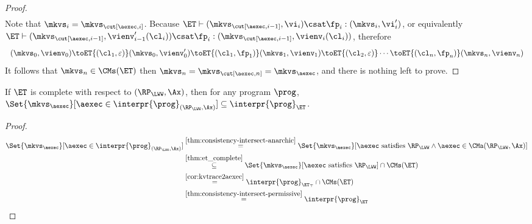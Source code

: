 \begin{proof}
\[\begin{array}{l}
\end{array}
\]
Note that $\mkvs_{i} = \mkvs_{\cut[\aexec, i]}$. 
Because $\ET \vdash ( \mkvs_{\cut[\aexec,i-1]}, \vi_i ) \csat \fp_{i} : (\mkvs_{i}, \vi'_{i})$, 
or equivalently $\ET \vdash ( \mkvs_{\cut[\aexec, i-1]}, \vienv'_{i-1}(\cl_{i}) ) \csat \fp_{i} : ( \mkvs_{\cut[\aexec, i-1]}, \vienv_{i}(\cl_{i}) )$, therefore 
\[
\begin{array}{l}
(\mkvs_{0}, \vienv_{0}) \toET{(\cl_{1}, \varepsilon)} (\mkvs_{0}, \vienv'_{0}) 
\toET{(\cl_{1}, \fp_{1})} (\mkvs_{1}, \vienv_{1})
\toET{(\cl_{2}, \varepsilon)}
\cdots \toET{(\cl_{n}, \fp_{n})} (\mkvs_{n}, \vienv_{n})
\end{array}
\]
It follows that $\mkvs_{n} \in \CMs(\ET)$ then $\mkvs_{n} = \mkvs_{\cut[\aexec, n]} = \mkvs_{\aexec}$, and there is nothing left to prove.
\end{proof}

\begin{corollary}
\label{cor:et-completeness}
If $\ET$ is complete with respect to $(\RP_{\LWW}, \Ax)$, then 
for any program $\prog$, $\Set{ \mkvs_{\aexec} }[ \aexec \in \interpr{\prog}_{(\RP_{\LWW}, \Ax)} ] \subseteq \interpr{\prog}_{\ET}$.
\end{corollary}
\begin{proof}
\begin{align*}
\Set{ \mkvs_{\aexec} }[ \aexec \in \interpr{\prog}_{(\RP_{\LWW}, \Ax)} ]
& \stackrel{\cref{thm:consistency-intersect-anarchic}}{=} 
\Set{\mkvs_{\aexec} }[ \aexec \text{ satisfies } \RP_{\LWW} \land \aexec \in \CMa(\RP_{\LWW}, \Ax) ] \\
& \stackrel{\cref{thm:et_complete}}{\subseteq} 
\Set{\mkvs_{\aexec} }[ \aexec \text{ satisfies } \RP_{\LWW}] \cap \CMs(\ET) \\
& \stackrel{\cref{cor:kvtrace2aexec}}{=} 
\interpr{\prog}_{\ET_\top} \cap \CMs(\ET) \\
& \stackrel{\cref{thm:consistency-intersect-permissive}}{=} 
\interpr{\prog}_{\ET} 
\end{align*}
\end{proof}

